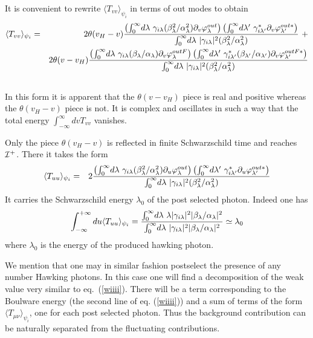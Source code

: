 \documentclass[12pt,oneside]{report}
\def\la{\lambda}
\def\beq {\begin{equation}}
\def\feq {\end{equation}}
\def\beqa {\begin{eqnarray}}
\def\p {\prime}
\begin{document}
It is convenient to rewrite $\langle T_{vv} \rangle
_{\psi_i}$
in terms of out modes 
to obtain
\beqa
\langle T_{vv} \rangle_{\psi_i} &=&2\/\theta(v_H-v){
\left(\int_0^\infty \! d\la\ 
\gamma_{i\la} ( \beta_\la^2/ \alpha_\la^2) \partial_v \varphi^{out }_\la\right)\left(
\int_0^\infty \! d\la^\p\ 
\gamma_{i \la^\p}^* 
\partial_v \varphi^{out  *}_{\la^\p}\right)
\over 
\int_0^\infty \! d\la\ 
\vert \gamma_{i\la} \vert^2( \beta_\la^2/ \alpha_\la^2)
} \ +\nonumber\\
&\ & 2\/ \theta(v-v_H){\left(
\int_0^\infty \! d\la\ 
\gamma_{i\la}( \beta_\la/ \alpha_\la)\partial_v \varphi^{out  F}_\la\right)\left(
\int_0^\infty \! d\la^\p\ 
\gamma_{i\la^\p}^* ( \beta_{\la^\p}/ \alpha_{\la^\p})
\partial_v \varphi^{out F *}_{\la^\p}\right)
\over 
\int_0^\infty \! d\la\ 
\vert \gamma_{i\la} \vert^2 ( \beta_\la^2/ \alpha_\la^2)
}\nonumber\\
&&
\label{wv}
\end{eqnarray}
In this form it is apparent that the $\theta(v-v_H)$ piece is real and
positive whereas the $\theta(v_H-v)$ piece is not. It is complex and
oscillates in such a way that the total energy $\int^{\infty}_{-\infty}
dv T_{vv}$ vanishes.

Only the piece $\theta(v_H-v)$ is reflected in finite Schwarzschild time
and reaches ${\cal I}^+$. There it takes the form
\beqa
\langle T_{uu} \rangle_{\psi_i} &=&
2{
 \left(\int_0^\infty \! d\la\ 
\gamma_{i\la} (\beta_\la^2 /\alpha_\la^2) \partial_u \varphi^{out }_\la\right)\left(
\int_0^\infty \! d\la^\p\ 
\gamma_{i\la^\p}^* 
\partial_u \varphi^{out *}_{\la^\p}\right)
\over 
\int_0^\infty \! d\la\ 
\vert \gamma_{i\la} \vert^2 ( \beta_\la^2/ \alpha_\la^2)
}
\label{wvi}
\end{eqnarray}
It carries the Schwarzschild energy $\la_0$ of the post selected photon. Indeed one has
\beq
\int_{-\infty}^{+\infty}
du \langle T_{uu} \rangle_{\psi_i}
={ 
\int_0^\infty \! d\la\ \la
\vert \gamma_{i\la} \vert^2 \vert \beta_\la /\alpha_\la\vert^2
\over 
\int_0^\infty \! d\la\ 
\vert \gamma_{i\la} \vert^2 \vert \beta_\la /\alpha_\la\vert^2
} \simeq \la_0
\label{wvii}\feq
where $\la_0$ is the energy of the produced hawking photon.

We mention that one may in similar fashion postselect the
presence of any number  Hawking photons. In this case one
will find a decomposition of the weak value very similar to eq.~(\ref{wiiii}).
There will be a term corresponding to the Boulware energy  (the second
line of eq. (\ref{wiiii})) and a sum of terms of the form $\langle
T_{\mu\nu}\rangle_{\psi_i}$, one for each post selected photon. Thus  the background
contribution 
can be naturally separated from the fluctuating
contributions.
\end{document}
